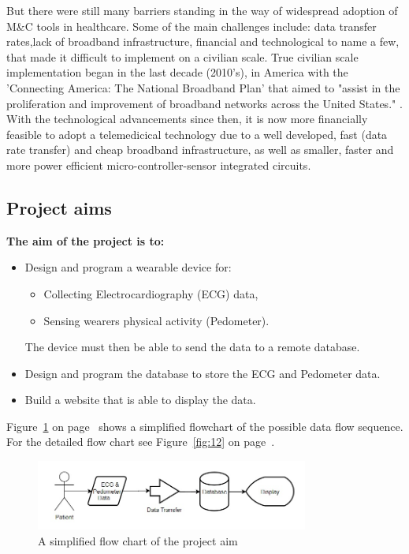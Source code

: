 \documentclass[12pt,]{article}
\numberwithin{figure}{section}
\begin{document}
But there were still many barriers standing in the way of widespread adoption of M\&C tools in healthcare. Some of the main challenges include: data transfer rates,lack of broadband infrastructure, financial and technological to name a few, that made it difficult to implement on a civilian scale. True civilian scale implementation began in the last decade (2010's), in America with the 'Connecting America: The National Broadband Plan' that aimed to "assist in the proliferation and improvement of broadband networks across the United States." \cite{FCC}. With the technological advancements since then, it is now more financially feasible to adopt a telemedicical technology  due to a well developed, fast (data rate transfer) and cheap broadband infrastructure, as well as smaller, faster and more power efficient micro-controller-sensor integrated circuits.
\subsection{Project aims}
\textbf{The aim of the project is to:}
\begin{itemize}
	\item[1] Design and program a wearable device for:
	\begin{itemize}
		\item Collecting Electrocardiography (ECG) data,
		\item Sensing wearers physical activity 					(Pedometer).
	\end{itemize}
	The device must then be able to send the data to a 			remote database.
	\item[2] Design and program the database to store the 		ECG and Pedometer data.
	\item[3] Build a website that is able to display the 		data. 
\end{itemize}
Figure~\ref{fig:2} on page~\pageref{fig:2} shows a simplified flowchart of the possible data flow sequence. For the detailed flow chart see Figure~\ref{fig:12} on page~\pageref{fig:12}.
\begin{figure}[h]
	\centering
    \includegraphics[width=0.8\textwidth]{2}
    \caption{A simplified flow chart of the project aim}
    \label{fig:2}
\end{figure}
\newpage
\end{document}
